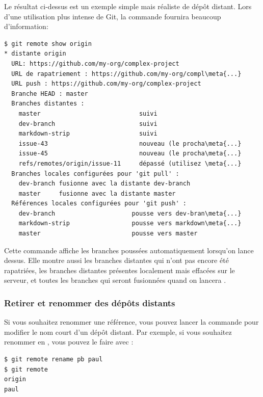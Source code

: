 Le résultat ci-dessus est un exemple simple mais réaliste de dépôt distant.
Lors d'une utilisation plus intense de Git, la commande  fournira beaucoup d'information:
\begin{Schunk}
\begin{Verbatim}[commandchars=\\\{\}]
$ git remote show origin
* distante origin
  URL: https://github.com/my-org/complex-project
  URL de rapatriement : https://github.com/my-org/compl\meta{...}
  URL push : https://github.com/my-org/complex-project
  Branche HEAD : master
  Branches distantes :
    master                           suivi
    dev-branch                       suivi
    markdown-strip                   suivi
    issue-43                         nouveau (le procha\meta{...}
    issue-45                         nouveau (le procha\meta{...}
    refs/remotes/origin/issue-11     dépassé (utilisez \meta{...}
  Branches locales configurées pour 'git pull' :
    dev-branch fusionne avec la distante dev-branch
    master     fusionne avec la distante master
  Références locales configurées pour 'git push' :
    dev-branch                     pousse vers dev-bran\meta{...}
    markdown-strip                 pousse vers markdown\meta{...}
    master                         pousse vers master
\end{Verbatim}
\end{Schunk}

Cette commande affiche les branches poussées automatiquement lorsqu'on lance  dessus.
Elle montre aussi les branches distantes qui n'ont pas encore été rapatriées, les branches distantes présentes localement mais effacées sur le serveur, et toutes les branches qui seront fusionnées quand on lancera .

\subsubsection{Retirer et renommer des dépôts distants}

Si vous souhaitez renommer une référence, vous pouvez lancer la commande  pour modifier le nom court d'un dépôt distant.
Par exemple, si vous souhaitez renommer  en , vous pouvez le faire avec :
\begin{Schunk}
\begin{Verbatim}
$ git remote rename pb paul
$ git remote
origin
paul
\end{Verbatim}
\end{Schunk}


